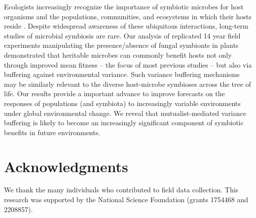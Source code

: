 \documentclass[12pt]{article}
\begin{document}
Ecologists increasingly recognize the importance of symbiotic microbes for host organisms and the populations, communities, and ecosystems in which their hosts reside \cite{rudgers2007forest, afkhami2016native, dallas2022captivity, smith2017symbiont}.
Despite widespread awareness of these ubiquitous interactions, long-term studies of microbial symbiosis are rare. 
Our analysis of replicated 14 year field experiments manipulating the presence/absence of fungal symbionts in plants demonstrated that heritable microbes can commonly benefit hosts not only through improved mean fitness -- the focus of most previous studies -- but also via buffering against environmental variance. 
Such variance buffering mechanisms may be similarly relevant to the diverse host-microbe symbioses across the tree of life.
Our results provide a important advance to improve forecasts on the responses of populations (and symbiota) to increasingly variable environments under global environmental change. We reveal that mutualist-mediated variance buffering is likely to become an increasingly significant component of symbiotic benefits in future environments.














\section*{Acknowledgments}
We thank the many individuals who contributed to field data collection. This research was supported by the National Science Foundation (grants 1754468 and 2208857). 
\end{document}
